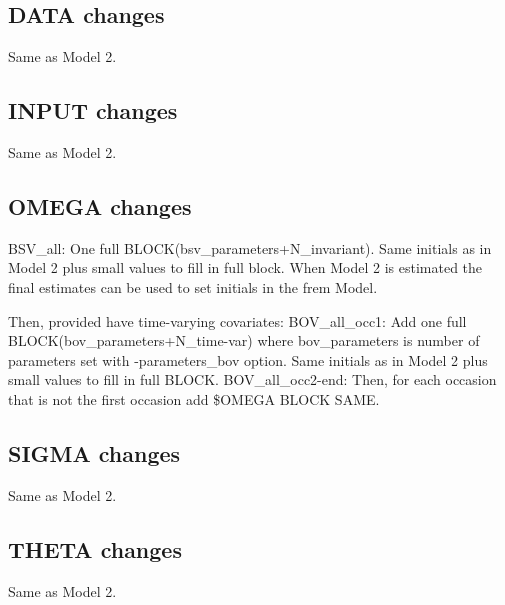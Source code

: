\subsection{DATA changes}
Same as Model 2.
\subsection{INPUT changes}
Same as Model 2.

\subsection{OMEGA changes}
BSV\_all: One full BLOCK(bsv\_parameters+N\_invariant).
Same initials as in Model 2 plus small values to fill in full block. When Model 2 is estimated
the final estimates can be used to set initials in the frem Model.

Then, provided have time-varying covariates:
BOV\_all\_occ1: Add one full BLOCK(bov\_parameters+N\_time-var) where bov\_parameters is number of parameters set with -parameters\_bov option.
Same initials as in Model 2 plus small values to fill in full BLOCK.
BOV\_all\_occ2-end: Then, for each occasion that is not the first occasion add \$OMEGA BLOCK SAME.

\subsection{SIGMA changes}
Same as Model 2.

\subsection{THETA changes}
Same as Model 2.

